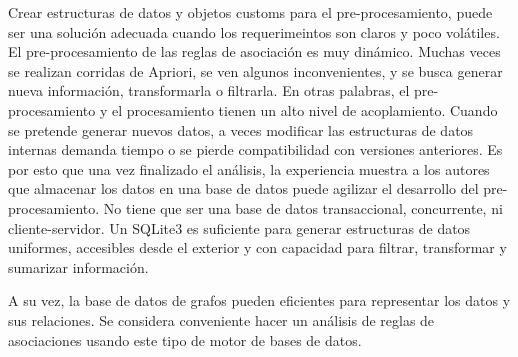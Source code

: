 \documentclass[journal]{IEEEtran}
\begin{document}
Crear estructuras de datos y objetos customs para el pre-procesamiento, puede
ser una solución adecuada cuando los requerimeintos son claros y poco
volátiles. El pre-procesamiento de las reglas de asociación es muy dinámico. 
Muchas veces se realizan corridas de Apriori, se ven algunos inconvenientes,
y se busca generar nueva información, transformarla o filtrarla. En otras
palabras, el pre-procesamiento y el procesamiento tienen un alto
nivel de acoplamiento. Cuando se
pretende generar nuevos datos, a veces modificar las estructuras de datos 
internas demanda tiempo o se pierde compatibilidad con versiones anteriores. Es
por esto que una vez finalizado el análisis, la experiencia muestra a los
autores que almacenar los datos en una base de datos puede agilizar
el desarrollo del pre-procesamiento. No tiene que ser una base de datos
transaccional, concurrente, ni cliente-servidor. Un SQLite3 es suficiente
para generar estructuras de datos uniformes, accesibles desde el exterior
y con capacidad para filtrar, transformar y sumarizar información.

A su vez, la base de datos de grafos pueden eficientes para representar
los datos y sus relaciones. Se considera conveniente hacer un análisis de 
reglas de asociaciones usando este tipo de motor de bases de datos.
\end{document}
